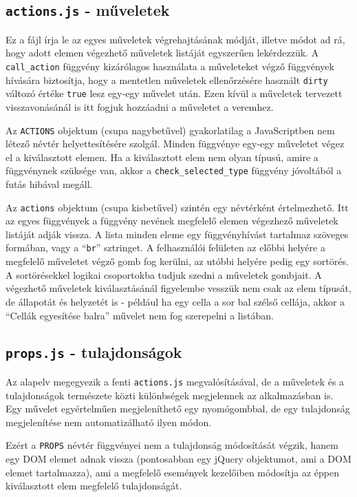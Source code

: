 \documentclass[12pt,a4paper,twoside]{article}
\begin{document}
\subsection{\texttt{actions.js} - műveletek}
Ez a fájl írja le az egyes műveletek végrehajtásának módját, illetve módot ad
rá, hogy adott elemen végezhető műveletek listáját egyszerűen lekérdezzük. A
\texttt{call\_action} függvény kizárólagos használata a műveleteket végző
függvények hívására biztosítja, hogy a mentetlen műveletek ellenőrzésére
használt \texttt{dirty} változó értéke \texttt{true} lesz egy-egy művelet
után. Ezen kívül a műveletek tervezett visszavonásánál is itt fogjuk hozzáadni a
műveletet a veremhez.

Az \texttt{ACTIONS} objektum (csupa nagybetűvel) gyakorlatilag a JavaScriptben
nem létező névtér helyettesítésére szolgál. Minden függvénye egy-egy műveletet
végez el a kiválasztott elemen. Ha a kiválasztott elem nem olyan típusú, amire a
függvénynek szüksége van, akkor a \texttt{check\_selected\_type} függvény
jóvoltából a futás hibával megáll.

Az \texttt{actions} objektum (csupa kisbetűvel) szintén egy névtérként
értelmezhető. Itt az egyes függvények a függvény nevének megfelelő elemen
végezhező műveletek listáját adják vissza. A lista minden eleme egy függvényhívást
tartalmaz szöveges formában, vagy a ``\texttt{br}'' sztringet. A felhasználói
felületen az előbbi helyére a megfelelő műveletet végző gomb fog kerülni, az
utóbbi helyére pedig egy sortörés. A sortörésekkel logikai csoportokba tudjuk
szedni a műveletek gombjait. A végezhető műveletek kiválasztásánál figyelembe
vesszük nem csak az elem típusát, de állapotát és helyzetét is - például ha egy
cella a sor bal szélső cellája, akkor a ``Cellák egyesítése balra'' művelet nem
fog szerepelni a listában.


\subsection{\texttt{props.js} - tulajdonságok}
Az alapelv megegyezik a fenti \texttt{actions.js} megvalósításával, de a
műveletek és a tulajdonságok természete közti különbségek megjelennek az
alkalmazásban is. Egy művelet egyértelműen megjeleníthető egy nyomógombbal, de
egy tulajdonság megjelenítése nem automatizálható ilyen módon.

Ezért a \texttt{PROPS} névtér függvényei nem a tulajdonság módosítását végzik,
hanem egy DOM elemet adnak vissza (pontosabban egy jQuery objektumot, ami a DOM
elemet tartalmazza), ami a megfelelő események kezelőiben módosítja az éppen
kiválasztott elem megfelelő tulajdonságát.
\end{document}
